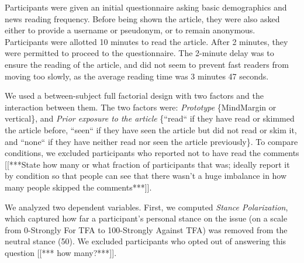 Participants were given an initial questionnaire asking basic demographics and news reading frequency. Before being shown the article, they were also asked either to provide a username or pseudonym, or to remain anonymous. Participants were allotted 10 minutes to read the article. After 2 minutes, they were permitted to proceed to the questionnaire. The 2-minute delay was to ensure the reading of the article, and did not seem to prevent fast readers from moving too slowly, as the average reading time was 3 minutes 47 seconds. 


We used a between-subject full factorial design with two factors and the interaction between them. The two factors were: {\it Prototype} \{MindMargin or vertical\}, and {\it Prior exposure to the article} \{``read`` if they have read or skimmed the article before, ``seen`` if they have seen the article but did not read or skim it, and ``none`` if they have neither read nor seen the article previously\}. To compare conditions, we excluded participants who reported not to have read the comments [[***State how many or what fraction of participants that was; ideally report it by condition so that people can see that there wasn't a huge imbalance in how many people skipped the comments***]].

We analyzed two dependent variables.  First, we computed {\it Stance Polarization}, which captured how far a participant's personal stance on the issue (on a scale from 0-Strongly For TFA to 100-Strongly Against TFA) was removed from the neutral stance (50).  We excluded participants who opted out of answering this question [[*** how many?***]]. 


